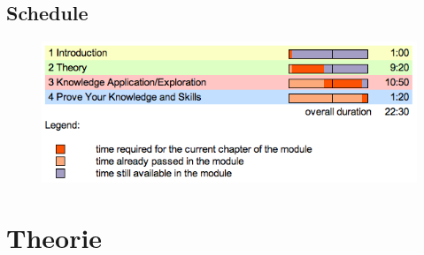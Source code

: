 \documentclass[11pt,a4paper]{scrreprt}
\begin{document}
\newpage

\section{Schedule}
\begin{figure}[!ht]
\centering
\includegraphics[width=0.8\linewidth]{img/schedule.png}
\end{figure}

\chapter{Theorie}
\end{document}
